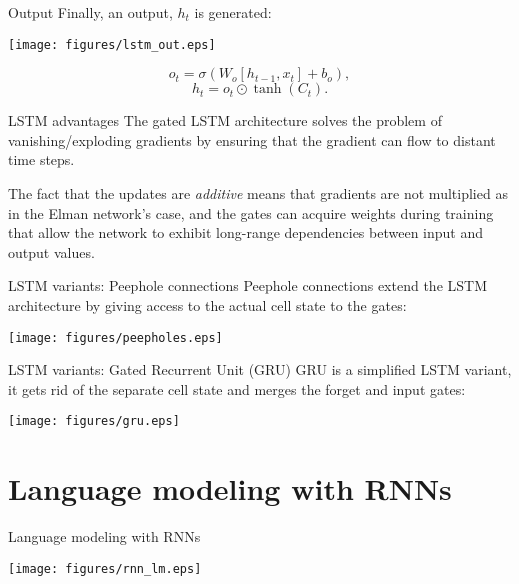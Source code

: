 \documentclass[style=upen, size=14pt]{powerdot}
\theoremstyle{definition}
\begin{document}
\begin{slide}[toc=Output]{Output}
  Finally, an output, $h_t$ is generated:
  \begin{center}
    \texttt{[image: figures/lstm\_out.eps]}
  \end{center}
  $$
  o_t = \sigma(W_o[h_{t-1}, x_t] + b_o),
  $$
  $$
  h_t = o_t \odot \tanh(C_t).
  $$
\end{slide}

\begin{slide}[toc=Advantages]{LSTM advantages}
  The gated LSTM architecture solves the problem of vanishing/exploding
  gradients by ensuring that the gradient can flow to distant time steps.\bigskip

  The fact that the updates are \emph{additive} means that gradients are not
  multiplied as in the Elman network's case, and the gates can acquire weights
  during training that allow the network to exhibit long-range dependencies
  between input and output values.
\end{slide}

\begin{slide}[toc=Peephole connections]{LSTM variants: Peephole connections}
  Peephole connections extend the LSTM architecture by giving access to the
  actual cell state to the gates:
  \begin{center}
    \texttt{[image: figures/peepholes.eps]}
  \end{center}
\end{slide}


\begin{slide}[toc=GRU]{LSTM variants: Gated Recurrent Unit (GRU)}
  GRU is a simplified LSTM variant, it gets rid of the separate cell
  state and merges the forget and input gates:
  \begin{center}
    \texttt{[image: figures/gru.eps]}
  \end{center}
\end{slide}

\section[toc=LMs with RNNs]{Language modeling with RNNs}

\begin{slide}{Language modeling with RNNs}
  \begin{center}
    \texttt{[image: figures/rnn\_lm.eps]}
  \end{center}
\end{slide}
\end{document}
